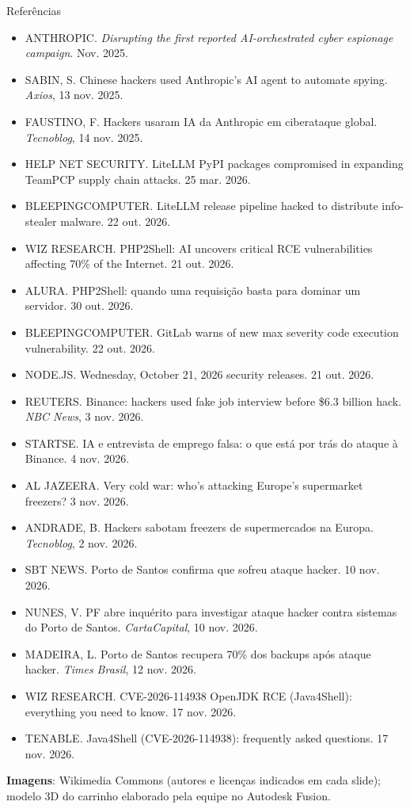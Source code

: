 \documentclass[aspectratio=169,10pt]{beamer}
\begin{document}
\begin{frame}[allowframebreaks]{Referências}
\tiny
\begin{itemize}
  \item ANTHROPIC. \emph{Disrupting the first reported AI-orchestrated cyber espionage campaign}. Nov. 2025.
  \item SABIN, S. Chinese hackers used Anthropic's AI agent to automate spying. \emph{Axios}, 13 nov. 2025.
  \item FAUSTINO, F. Hackers usaram IA da Anthropic em ciberataque global. \emph{Tecnoblog}, 14 nov. 2025.
  \item HELP NET SECURITY. LiteLLM PyPI packages compromised in expanding TeamPCP supply chain attacks. 25 mar. 2026.
  \item BLEEPINGCOMPUTER. LiteLLM release pipeline hacked to distribute info-stealer malware. 22 out. 2026.
  \item WIZ RESEARCH. PHP2Shell: AI uncovers critical RCE vulnerabilities affecting 70\% of the Internet. 21 out. 2026.
  \item ALURA. PHP2Shell: quando uma requisição basta para dominar um servidor. 30 out. 2026.
  \item BLEEPINGCOMPUTER. GitLab warns of new max severity code execution vulnerability. 22 out. 2026.
  \item NODE.JS. Wednesday, October 21, 2026 security releases. 21 out. 2026.
  \item REUTERS. Binance: hackers used fake job interview before \$6.3 billion hack. \emph{NBC News}, 3 nov. 2026.
  \item STARTSE. IA e entrevista de emprego falsa: o que está por trás do ataque à Binance. 4 nov. 2026.
  \item AL JAZEERA. Very cold war: who's attacking Europe's supermarket freezers? 3 nov. 2026.
  \item ANDRADE, B. Hackers sabotam freezers de supermercados na Europa. \emph{Tecnoblog}, 2 nov. 2026.
  \item SBT NEWS. Porto de Santos confirma que sofreu ataque hacker. 10 nov. 2026.
  \item NUNES, V. PF abre inquérito para investigar ataque hacker contra sistemas do Porto de Santos. \emph{CartaCapital}, 10 nov. 2026.
  \item MADEIRA, L. Porto de Santos recupera 70\% dos backups após ataque hacker. \emph{Times Brasil}, 12 nov. 2026.
  \item WIZ RESEARCH. CVE-2026-114938 OpenJDK RCE (Java4Shell): everything you need to know. 17 nov. 2026.
  \item TENABLE. Java4Shell (CVE-2026-114938): frequently asked questions. 17 nov. 2026.
\end{itemize}
\textbf{Imagens}: Wikimedia Commons (autores e licenças indicados em cada slide); modelo 3D do carrinho elaborado pela equipe no Autodesk Fusion.
\end{frame}
\end{document}
